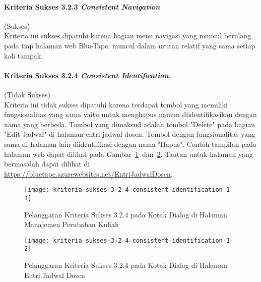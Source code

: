 \paragraph{Kriteria Sukses 3.2.3 \textit{Consistent Navigation}}
\label{par:kepatuhan_bluetape_kriteria_sukses_3.2.3}
(Sukses)\\

Kriteria ini sukses dipatuhi karena bagian menu navigasi yang muncul berulang pada tiap halaman web BlueTape, muncul dalam urutan relatif yang sama setiap kali tampak.

\paragraph{Kriteria Sukses 3.2.4 \textit{Consistent Identification}}
\label{par:kepatuhan_bluetape_kriteria_sukses_3.2.4}
(Tidak Sukses)\\

Kriteria ini tidak sukses dipatuhi karena terdapat tombol yang memiliki fungsionalitas yang sama yaitu untuk menghapus namun diidentifikasikan dengan nama yang berbeda. Tombol yang dimaksud adalah tombol "Delete" pada bagian "Edit Jadwal" di halaman entri jadwal dosen. Tombol dengan fungsionalitas yang sama di halaman lain diidentifikasi dengan nama "Hapus". Contoh tampilan pada halaman web dapat dilihat pada \mbox{Gambar \ref{fig:3.2.4_consistent_identification_1} dan \ref{fig:3.2.4_consistent_identification_2}}. Tautan untuk halaman yang bermasalah dapat dilihat di \url{https://bluetape.azurewebsites.net/EntriJadwalDosen}.

\begin{figure}[H]
    \centering  
    \texttt{[image: kriteria-sukses-3-2-4-consistent-identification-1-1]}  
    \caption[Pelanggaran Kriteria Sukses 3.2.4 pada Kotak Dialog di Halaman Manajemen Perubahan Kuliah]{Pelanggaran Kriteria Sukses 3.2.4 pada Kotak Dialog di Halaman Manajemen Perubahan Kuliah}
    \label{fig:3.2.4_consistent_identification_1}  
\end{figure}

\begin{figure}[H]
    \centering  
    \texttt{[image: kriteria-sukses-3-2-4-consistent-identification-1-2]}  
    \caption[Pelanggaran Kriteria Sukses 3.2.4 pada Kotak Dialog di Halaman Entri Jadwal Dosen]{Pelanggaran Kriteria Sukses 3.2.4 pada Kotak Dialog di Halaman Entri Jadwal Dosen}
    \label{fig:3.2.4_consistent_identification_2}  
\end{figure}

